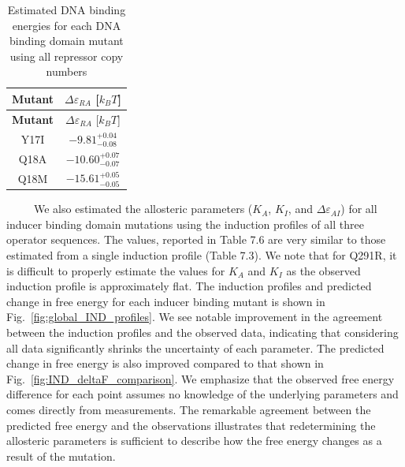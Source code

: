 \documentclass[12pt]{caltech_thesis}
\begin{document}
\begin{longtable}[]{@{}cc@{}}
\caption{Estimated DNA binding energies for each DNA binding domain
mutant using all repressor copy numbers}\tabularnewline
\toprule()
\textbf{Mutant} & \(\Delta\varepsilon_{RA}\) {[}\(k_BT\){]} \\
\midrule()
\endfirsthead
\toprule()
\textbf{Mutant} & \(\Delta\varepsilon_{RA}\) {[}\(k_BT\){]} \\
\midrule()
\endhead
Y17I & \(-9.81^{+0.04}_{-0.08}\) \\
Q18A & \(-10.60^{+0.07}_{-0.07}\) \\
Q18M & \(-15.61^{+0.05}_{-0.05}\) \\
\bottomrule()
\end{longtable}

~~~~~We also estimated the allosteric parameters (\(K_A\), \(K_I\), and
\(\Delta\varepsilon_{AI}\)) for all inducer binding domain mutations
using the induction profiles of all three operator sequences. The
values, reported in Table 7.6 are very similar to those estimated from a
single induction profile (Table 7.3). We note that for Q291R, it is
difficult to properly estimate the values for \(K_A\) and \(K_I\) as the
observed induction profile is approximately flat. The induction profiles
and predicted change in free energy for each inducer binding mutant is
shown in Fig.~\ref{fig:global_IND_profiles}. We see notable improvement
in the agreement between the induction profiles and the observed data,
indicating that considering all data significantly shrinks the
uncertainty of each parameter. The predicted change in free energy is
also improved compared to that shown in
Fig.~\ref{fig:IND_deltaF_comparison}. We emphasize that the observed
free energy difference for each point assumes no knowledge of the
underlying parameters and comes directly from measurements. The
remarkable agreement between the predicted free energy and the
observations illustrates that redetermining the allosteric parameters is
sufficient to describe how the free energy changes as a result of the
mutation.
\end{document}
